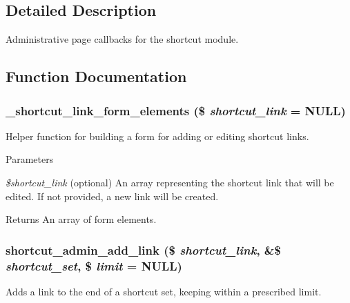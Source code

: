 \subsection{Detailed Description}
Administrative page callbacks for the shortcut module. 

\subsection{Function Documentation}
\hypertarget{shortcut_8admin_8inc_a738b105ee9dfcf0a5f642e90d24cfa1f}{
\subsubsection[{\_\-shortcut\_\-link\_\-form\_\-elements}]{\setlength{\rightskip}{0pt plus 5cm}\_\-shortcut\_\-link\_\-form\_\-elements (\$ {\em shortcut\_\-link} = {\ttfamily NULL})}}
\label{shortcut_8admin_8inc_a738b105ee9dfcf0a5f642e90d24cfa1f}
Helper function for building a form for adding or editing shortcut links.


\begin{DoxyParams}{Parameters}
\item[{\em \$shortcut\_\-link}](optional) An array representing the shortcut link that will be edited. If not provided, a new link will be created.\end{DoxyParams}
\begin{DoxyReturn}{Returns}
An array of form elements. 
\end{DoxyReturn}
\hypertarget{shortcut_8admin_8inc_aa9f17ec07d3f6862a353e7dd0b84c8f4}{
\subsubsection[{shortcut\_\-admin\_\-add\_\-link}]{\setlength{\rightskip}{0pt plus 5cm}shortcut\_\-admin\_\-add\_\-link (\$ {\em shortcut\_\-link}, \/  \&\$ {\em shortcut\_\-set}, \/  \$ {\em limit} = {\ttfamily NULL})}}
\label{shortcut_8admin_8inc_aa9f17ec07d3f6862a353e7dd0b84c8f4}
Adds a link to the end of a shortcut set, keeping within a prescribed limit.


